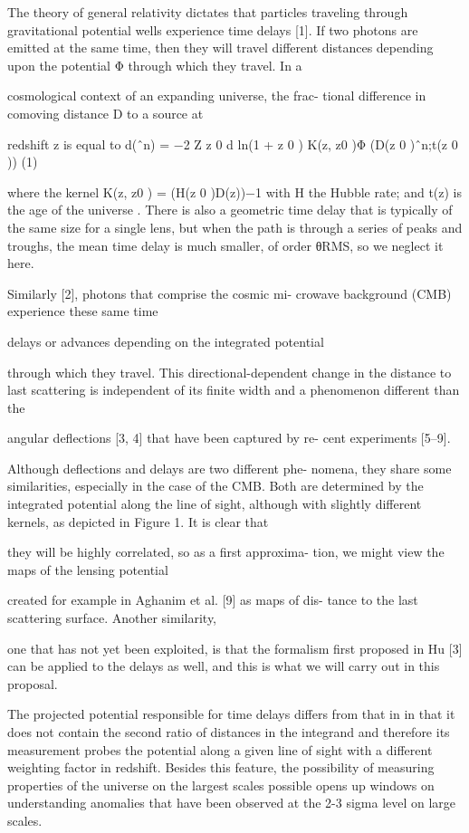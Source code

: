 The theory of general relativity dictates that particles
traveling through gravitational potential wells experience
time delays [1]. If two photons are emitted at the same
time, then they will travel different distances depending
upon the potential Φ through which they travel. In a

cosmological context of an expanding universe, the frac-
tional difference in comoving distance D to a source at

redshift z is equal to
d(ˆn) = −2
Z z
0
d ln(1 + z
0
) K(z, z0
)Φ (D(z
0
)ˆn;t(z
0
)) (1)

where the kernel K(z, z0
) = (H(z
0
)D(z))−1 with H the
Hubble rate; and t(z) is the age of the universe . There is
also a geometric time delay that is typically of the same
size for a single lens, but when the path is through a
series of peaks and troughs, the mean time delay is much
smaller, of order θRMS, so we neglect it here.

Similarly [2], photons that comprise the cosmic mi-
crowave background (CMB) experience these same time

delays or advances depending on the integrated potential

through which they travel.
This directional-dependent
change in the distance to last scattering is independent
of its finite width and a phenomenon different than the

angular deflections [3, 4] that have been captured by re-
cent experiments [5–9].

Although deflections and delays are two different phe-
nomena, they share some similarities, especially in the
case of the CMB. Both are determined by the integrated
potential along the line of sight, although with slightly
different kernels, as depicted in Figure 1. It is clear that

they will be highly correlated, so as a first approxima-
tion, we might view the maps of the lensing potential

created for example in Aghanim et al. [9] as maps of dis-
tance to the last scattering surface. Another similarity,

one that has not yet been exploited, is that the formalism
first proposed in Hu [3] can be applied to the delays as
well, and this is what we will carry out in this proposal.


The projected potential
responsible for time delays differs from that in  in that it
does not contain the second ratio of distances in the integrand and
therefore its measurement probes the potential along a given line of
sight with a different weighting factor in redshift. Besides this
feature, the possibility of measuring properties of the universe on
the largest scales possible opens up windows on understanding
anomalies that have been observed at the 2-3 sigma level on large
scales.
